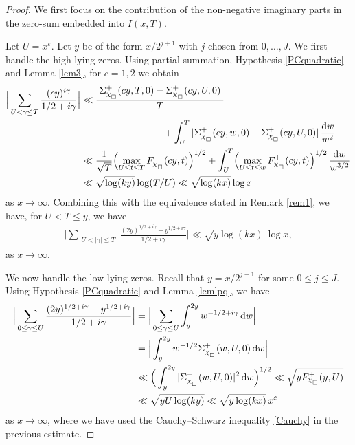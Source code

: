 \documentclass[pdflatex]{sn-jnl}%
\newcommand{\eps}{\ensuremath{\varepsilon}}
\newcommand{\dx}{\mathrm{d}}
\theoremstyle{sltheorems}
\theoremstyle{plainrem}
\theoremstyle{definition}
\begin{document}
\begin{proof} 
We first focus on the contribution of the non-negative 
imaginary parts in the zero-sum embedded into $I(x,T)$.

Let $U = x^{\eps}$.
Let $y$ be of the form $x/2^{j+1}$ with $j$ chosen from $0,\dotsc,J$.
%
We first handle the high-lying zeros.
Using partial summation, Hypothesis \ref{PCquadratic} and Lemma \ref{lem3}, for $c=1,2$ we obtain
\begin{align*}
\notag
  \Big \vert  \sum_{\substack{U <  \gamma \le  T}
  } \frac{(cy)^{ i\gamma}}{1/2 + i\gamma} \Big \vert  
 &
   \ll  \frac{\vert \Sigma^+_{\chi_{_\square}}(cy,T,0) - \Sigma^+_{\chi_{_\square}}(cy,U,0) \vert}{T}
 \\& \hskip3cm
\notag
  +
   \int_{U}^{T} 
   \vert
   \Sigma^+_{\chi_{_\square}}(cy,w,0) - \Sigma^+_{\chi_{_\square}}(cy,U,0)
   \vert
  \, \frac{\dx w}{w^2} \\
  \nonumber
  & \ll \frac{1}{\sqrt{T}} \Bigl(
\max_{U \le  t \le T}
F^+_{\chi_{_\square}}(cy,t) \Bigr)^{1/2} +
\int_{U}^{T}  \Bigl(
\max_{U \le  t \le w}
F^+_{\chi_{_\square}}(cy,t) \Bigr)^{1/2}\, \frac{\dx w}{w^{3/2}}
\\
&\ll \sqrt{\log (ky)} \log (T/U) 
\ll \sqrt{\log (kx)} \log x
\end{align*}
as $x \to \infty.$
%
Combining this with the equivalence stated in Remark \ref{rem1}, we have, for $U < T \le  y$, we have
  \begin{align}\label{treat1q}
\Big \vert   \sum_{\substack{ U <  |\gamma| \le  T}
 } \frac{(2y)^{1/2+ i\gamma}-y^{1/2+i\gamma}}{1/2 + i\gamma} \Big \vert   
 \ll \sqrt{y\log (kx)} \, \log x,
   \end{align}
as $x \to \infty$.

We now handle the low-lying zeros.
Recall that $y=x/2^{j+1}$ for some $0\le j\le J$. 
Using  Hypothesis \ref{PCquadratic} and Lemma \ref{lemlpq}, we have
\begin{align}
\notag
%
\Big \vert  \sum_{\substack{ 0 \le \gamma  \le  U
 }} 
 \frac{(2y)^{1/2+ i\gamma}-y^{1/2+i\gamma}}{1/2 + i\gamma} \Big \vert   
 & =
\Big \vert \sum_{\substack{ 0 \le \gamma \le  U
 }} 
 \int_{y}^{2y} w^{-1/2+i\gamma}\, \dx w \Big \vert  
\\& \notag
=
 \Big \vert \int_{y}^{2y} w^{-1/2} 
 \Sigma^+_{\chi_{_\square}}(w,U,0)
\, \dx w\Big \vert 
\\ &
\notag
 \ll
 \Big( \int_{y}^{2y} 
 \vert\Sigma^+_{\chi_{_\square}}(w,U,0) \vert^2
\, \dx w\Big)^{1/2}
 \ll 
  \sqrt{y F^+_{\chi_{_\square}}(y, U)} 
  \\
 \label{treat12q}
 &
 \ll 
 \sqrt{y U \log (ky)}
 \ll
 \sqrt{y\log (kx)} \, x^{\eps} 
\end{align}
as $x \to \infty$, where we have used the Cauchy--Schwarz inequality \eqref{Cauchy}
in the previous estimate.


\end{proof}
\end{document}

